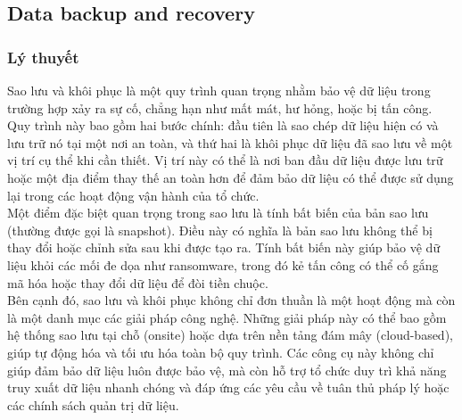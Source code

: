 \subsection{Data backup and recovery}
\subsubsection{Lý thuyết}
\indent Sao lưu và khôi phục là một quy trình quan trọng nhằm bảo vệ dữ liệu trong trường hợp xảy ra sự cố, chẳng hạn như mất mát, hư hỏng, hoặc bị tấn công. Quy trình này bao gồm hai bước chính: đầu tiên là sao chép dữ liệu hiện có và lưu trữ nó tại một nơi an toàn, và thứ hai là khôi phục dữ liệu đã sao lưu về một vị trí cụ thể khi cần thiết. Vị trí này có thể là nơi ban đầu dữ liệu được lưu trữ hoặc một địa điểm thay thế an toàn hơn để đảm bảo dữ liệu có thể được sử dụng lại trong các hoạt động vận hành của tổ chức.\\

Một điểm đặc biệt quan trọng trong sao lưu là tính bất biến của bản sao lưu (thường được gọi là snapshot). Điều này có nghĩa là bản sao lưu không thể bị thay đổi hoặc chỉnh sửa sau khi được tạo ra. Tính bất biến này giúp bảo vệ dữ liệu khỏi các mối đe dọa như ransomware, trong đó kẻ tấn công có thể cố gắng mã hóa hoặc thay đổi dữ liệu để đòi tiền chuộc.\\

Bên cạnh đó, sao lưu và khôi phục không chỉ đơn thuần là một hoạt động mà còn là một danh mục các giải pháp công nghệ. Những giải pháp này có thể bao gồm hệ thống sao lưu tại chỗ (onsite) hoặc dựa trên nền tảng đám mây (cloud-based), giúp tự động hóa và tối ưu hóa toàn bộ quy trình. Các công cụ này không chỉ giúp đảm bảo dữ liệu luôn được bảo vệ, mà còn hỗ trợ tổ chức duy trì khả năng truy xuất dữ liệu nhanh chóng và đáp ứng các yêu cầu về tuân thủ pháp lý hoặc các chính sách quản trị dữ liệu.
